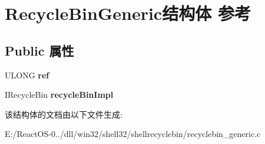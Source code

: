 \hypertarget{struct_recycle_bin_generic}{}\section{Recycle\+Bin\+Generic结构体 参考}
\label{struct_recycle_bin_generic}
\subsection*{Public 属性}
\begin{DoxyCompactItemize}
\item 
\mbox{\label{struct_recycle_bin_generic_a48df0a768064562f0423707f953f99d2}} 
U\+L\+O\+NG {\bfseries ref}
\item 
\mbox{\label{struct_recycle_bin_generic_a105dbf1f269f1e8835a5a0767c1f97db}} 
I\+Recycle\+Bin {\bfseries recycle\+Bin\+Impl}
\end{DoxyCompactItemize}


该结构体的文档由以下文件生成\+:\begin{DoxyCompactItemize}
\item 
E\+:/\+React\+O\+S-\/0../dll/win32/shell32/shellrecyclebin/recyclebin\+\_\+generic.\+c\end{DoxyCompactItemize}
